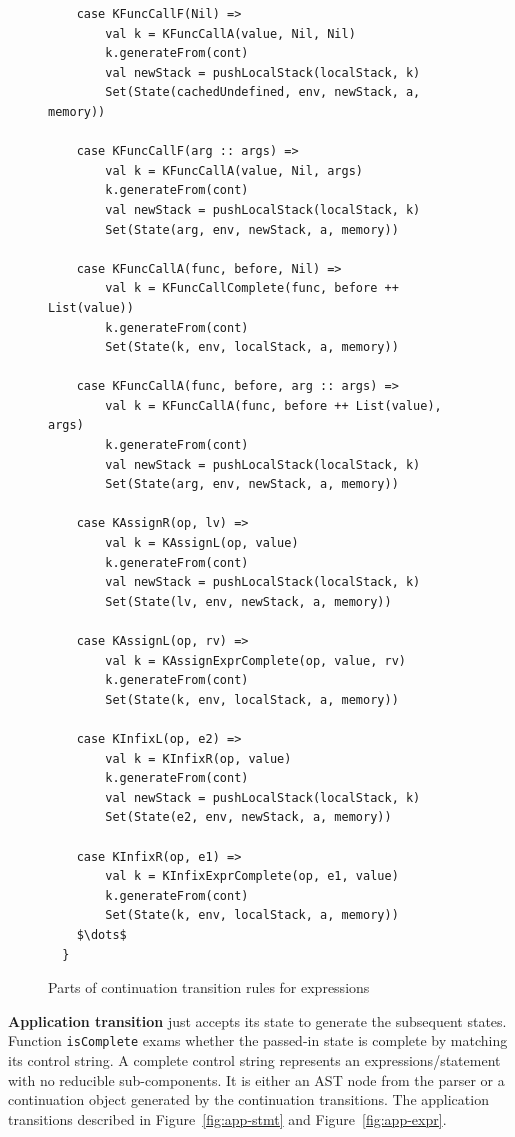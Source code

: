 \documentclass[12pt]{report}
\begin{document}
\begin{figure}
\lstset{language=Scala, mathescape,
basicstyle=\scriptsize\ttfamily}
\begin{lstlisting}
    case KFuncCallF(Nil) =>
        val k = KFuncCallA(value, Nil, Nil)
        k.generateFrom(cont)
        val newStack = pushLocalStack(localStack, k)
        Set(State(cachedUndefined, env, newStack, a, memory))

    case KFuncCallF(arg :: args) =>
        val k = KFuncCallA(value, Nil, args)
        k.generateFrom(cont)
        val newStack = pushLocalStack(localStack, k)
        Set(State(arg, env, newStack, a, memory))

    case KFuncCallA(func, before, Nil) =>
        val k = KFuncCallComplete(func, before ++ List(value))
        k.generateFrom(cont)
        Set(State(k, env, localStack, a, memory))

    case KFuncCallA(func, before, arg :: args) =>
        val k = KFuncCallA(func, before ++ List(value), args)
        k.generateFrom(cont)
        val newStack = pushLocalStack(localStack, k)
        Set(State(arg, env, newStack, a, memory))

    case KAssignR(op, lv) =>
        val k = KAssignL(op, value)
        k.generateFrom(cont)
        val newStack = pushLocalStack(localStack, k)
        Set(State(lv, env, newStack, a, memory))

    case KAssignL(op, rv) =>
        val k = KAssignExprComplete(op, value, rv)
        k.generateFrom(cont)
        Set(State(k, env, localStack, a, memory))

    case KInfixL(op, e2) =>
        val k = KInfixR(op, value)
        k.generateFrom(cont)
        val newStack = pushLocalStack(localStack, k)
        Set(State(e2, env, newStack, a, memory))

    case KInfixR(op, e1) =>
        val k = KInfixExprComplete(op, e1, value)
        k.generateFrom(cont)
        Set(State(k, env, localStack, a, memory))
    $\dots$
  }
\end{lstlisting}
\caption{Parts of continuation transition rules for expressions}
\label{fig:cont-expr}
\end{figure}

\textbf{Application transition} just accepts its state to generate the subsequent states. Function \verb|isComplete| exams whether the passed-in state is complete by matching its control string.
A complete control string represents an expressions/statement with no reducible sub-components.
It is either an AST node from the parser or a continuation object generated by the continuation transitions.
The application transitions described in Figure~\ref{fig:app-stmt} and Figure~\ref{fig:app-expr}.
\end{document}
